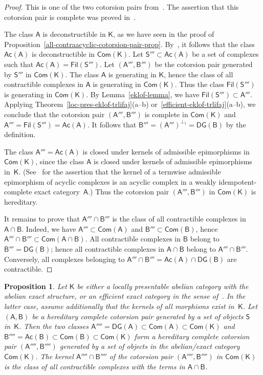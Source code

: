 \documentclass[12pt,a4paper]{amsart}
\newcommand{\+}{\nobreakdash-}
\renewcommand{\:}{\colon}
\newcommand{\sA}{\mathsf A}
\newcommand{\sB}{\mathsf B}
\newcommand{\sK}{\mathsf K}
\newcommand{\sS}{\mathsf S}
\newcommand{\Com}{\mathsf{Com}}
\newcommand{\Ac}{\mathsf{Ac}}
\newcommand{\DG}{\mathsf{DG}}
\newcommand{\Fil}{\mathsf{Fil}}
\theoremstyle{plain}
\newtheorem{prop}[thm]{Proposition}
\theoremstyle{definition}
\begin{document}
\begin{proof}
 This is one of the two cotorsion pairs
from~\cite[Proposition~3.6]{Gil}.
 The assertion that this cotorsion pair is complete was proved
in~\cite[Lemma~4.9]{Gil3}.

 The class $\sA$ is deconstructible in $\sK$, as we have seen in
the proof of Proposition~\ref{all-contraacyclic-cotorsion-pair-prop}.
 By~\cite[Proposition~4.4]{Sto-hill}, it follows that the class
$\Ac(\sA)$ is deconstructible in $\Com(\sK)$.
 Let $\sS'''\subset\Ac(\sA)$ be a set of complexes such that
$\Ac(\sA)=\Fil(\sS''')$.
 Let $(\sA''',\sB''')$ be the cotorsion pair generated by $\sS'''$ in
$\Com(\sK)$.
 The class $\sA$ is generating in $\sK$, hence the class of all
contractible complexes in $\sA$ is generating in $\Com(\sK)$.
 Thus the class $\Fil(\sS''')$ is generating in $\Com(\sK)$.
 By Lemma~\ref{eklof-lemma}, we have $\Fil(\sS''')\subset\sA'''$.
 Applying Theorem~\ref{loc-pres-eklof-trlifaj}(a\+-b)
or~\ref{efficient-eklof-trlifaj}(a\+-b), we conclude that
the cotorsion pair $(\sA''',\sB''')$ is complete in $\Com(\sK)$
and $\sA'''=\Fil(\sS''')=\Ac(\sA)$.
 It follows that $\sB'''=(\sA''')^{\perp_1}=\DG(\sB)$ by
the definition.

 The class $\sA'''=\Ac(\sA)$ is closed under kernels of admissible
epimorphisms in $\Com(\sK)$, since the class $\sA$ is closed under
kernels of admissible epimorphisms in~$\sK$.
 (See~\cite[Corollary~3.6 and Proposition~7.6]{Bueh} for the assertion
that the kernel of a termwise admissible epimorphism of acyclic
complexes is an acyclic complex in a weakly idempotent-complete
exact category~$\sA$.)
 Thus the cotorsion pair $(\sA''',\sB''')$ in $\Com(\sK)$ is hereditary.

 It remains to prove that $\sA'''\cap\sB'''$ is the class of all
contractible complexes in $\sA\cap\sB$.
 Indeed, we have $\sA'''\subset\Com(\sA)$ and $\sB'''\subset\Com(\sB)$,
hence $\sA'''\cap\sB'''\subset\Com(\sA\cap\sB)$.
 All contractible complexes in $\sB$ belong to~$\sB'''=\DG(\sB)$; hence
all contractible complexes in $\sA\cap\sB$ belong to $\sA'''\cap\sB'''$.
 Conversely, all complexes belonging to $\sA'''\cap\sB'''=
\Ac(\sA)\cap\DG(\sB)$ are contractible.
\end{proof}

\begin{prop} \label{dg-acyclic-cotorsion-pair-prop}
 Let\/ $\sK$ be either a locally presentable abelian category with
the abelian exact structure, or an efficient exact category in
the sense of\/~\cite{Sto-ICRA}.
 In the latter case, assume additionally that the kernels of all
morphisms exist in\/~$\sK$.
 Let $(\sA,\sB)$ be a hereditary complete cotorsion pair generated
by a set of objects\/ $\sS$ in\/~$\sK$.
 Then the two classes\/ $\sA''''=\DG(\sA)\subset\Com(\sA)\subset
\Com(\sK)$ and\/ $\sB''''=\Ac(\sB)\subset\Com(\sB)\subset\Com(\sK)$
form a hereditary complete cotorsion pair $(\sA'''',\sB'''')$ generated
by a set of objects in the abelian/exact category\/ $\Com(\sK)$.
 The kernel\/ $\sA''''\cap\sB''''$ of the cotorsion pair
$(\sA'''',\sB'''')$ in\/ $\Com(\sK)$ is the class of all contractible
complexes with the terms in\/ $\sA\cap\sB$.
\end{prop}
\end{document}
